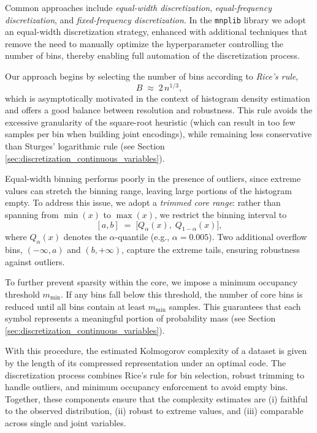 Common approaches include \emph{equal-width discretization}, \emph{equal-frequency discretization}, and \emph{fixed-frequency discretization}. In the \texttt{mnplib} library we adopt an equal-width discretization strategy, enhanced with additional techniques that remove the need to manually optimize the hyperparameter controlling the number of bins, thereby enabling full automation of the discretization process.

Our approach begins by selecting the number of bins according to \emph{Rice's rule},
\[
B \;\approx\; 2 \, n^{1/3},
\]
which is asymptotically motivated in the context of histogram density estimation and offers a good balance between resolution and robustness. This rule avoids the excessive granularity of the square-root heuristic (which can result in too few samples per bin when building joint encodings), while remaining less conservative than Sturges’ logarithmic rule (see Section \ref{sec:discretization_continuous_variables}).

Equal-width binning performs poorly in the presence of outliers, since extreme values can stretch the binning range, leaving large portions of the histogram empty. To address this issue, we adopt a \emph{trimmed core range}: rather than spanning from $\min(x)$ to $\max(x)$, we restrict the binning interval to
\[
[a, b] \;=\; \bigl[ Q_\alpha(x), \; Q_{1-\alpha}(x) \bigr],  
\]
where $Q_\alpha(x)$ denotes the $\alpha$-quantile (e.g., $\alpha = 0.005$). Two additional overflow bins, $(-\infty, a)$ and $(b, +\infty)$, capture the extreme tails, ensuring robustness against outliers.

To further prevent sparsity within the core, we impose a minimum occupancy threshold $m_{\min}$. If any bins fall below this threshold, the number of core bins is reduced until all bins contain at least $m_{\min}$ samples. This guarantees that each symbol represents a meaningful portion of probability mass (see Section \ref{sec:discretization_continuous_variables}).

With this procedure, the estimated Kolmogorov complexity of a dataset is given by the length of its compressed representation under an optimal code. The discretization process combines Rice's rule for bin selection, robust trimming to handle outliers, and minimum occupancy enforcement to avoid empty bins. Together, these components ensure that the complexity estimates are (i) faithful to the observed distribution, (ii) robust to extreme values, and (iii) comparable across single and joint variables.

